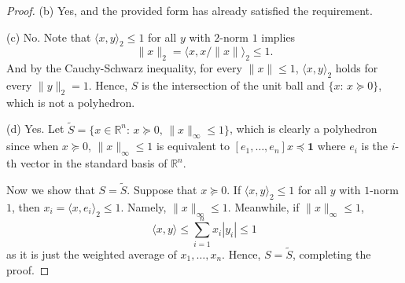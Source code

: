 \begin{proof}
  (b) Yes, and the provided form has already satisfied the requirement.\par
  (c) No. Note that $\langle x,y\rangle_2\le1$ for all $y$ with $2$-norm $1$ 
  implies
  \[
    \|x\|_2 = \langle x,x/\|x\|\rangle_2 \le 1.
  \]
  And by the Cauchy-Schwarz inequality, for every $\|x\|\le 1$, $\langle x,y
  \rangle_2$ holds for every $\|y\|_2=1$. Hence, $S$ is the intersection of the
  unit ball and $\{x:\,x\succeq 0\}$, which is not a polyhedron.\par
  (d) Yes. Let $\tilde{S}=\{x\in\mathbb{R}^n:\,x\succeq 0,\,\|x\|_\infty\le1\}$, 
  which is clearly a polyhedron since when $x\succeq 0$, $\|x\|_\infty\le 1$ is 
  equivalent to $[e_1,\dots,e_n]x\preceq \mathbf{1}$ where $e_i$ is the $i$-th 
  vector in the standard basis of $\mathbb{R}^n$.\par
  Now we show that $S=\tilde{S}$. Suppose that $x\succeq 0$. If $\langle x,y
  \rangle_2\le 1$ for all $y$ with $1$-norm $1$, then $x_i = \langle x,e_i
  \rangle_2 \le 1$. Namely, $\|x\|_\infty\le 1$. Meanwhile, if $\|x\|_\infty\le 
  1$, 
  \[
    \langle x,y\rangle \le \sum_{i=1}^n x_i|y_i| \le 1
  \]
  as it is just the weighted average of $x_1,\dots,x_n$. Hence, $S=\tilde{S}$,
  completing the proof.
\end{proof}


